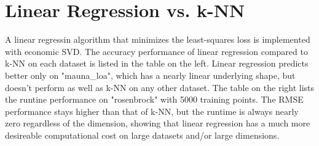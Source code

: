 \documentclass{article} %
\begin{document}
\section*{Linear Regression vs. k-NN} %
A linear regressin algorithm that minimizes the least-squares loss is implemented with economic SVD. The accuracy performance of linear regression compared to k-NN on each dataset is listed in the table on the left. Linear regression predicts better only on "mauna\_loa", which has a nearly linear underlying shape, but doesn't perform as well as k-NN on any other dataset. The table on the right lists the runtine performance on "rosenbrock" with 5000 training points. The RMSE performance stays higher than that of k-NN, but the runtime is always nearly zero regardless of the dimension, showing that linear regression has a much more desireable computational cost on large datasets and/or large dimensions.
\begin{table}[!ht]
\begin{minipage}{0.44\textwidth}
\raggedleft
{}
\hspace{0.02\textwidth}
\end{minipage}
\hspace{0.03\textwidth}\begin{minipage}{0.57\textwidth}
\centering
{}
\end{minipage}
\caption{Average RMSE over the 5 folds of each classification dataset}
\end{table}
\end{document}
